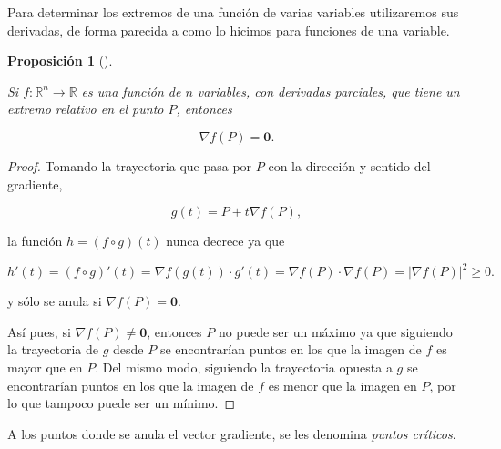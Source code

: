 \documentclass[
  a4paper,
]{scrreport}
\theoremstyle{definition}
\theoremstyle{definition}
\theoremstyle{definition}
\theoremstyle{plain}
\theoremstyle{plain}
\theoremstyle{plain}
\newtheorem{proposition}{Proposición}[chapter]
\theoremstyle{remark}
\begin{document}
Para determinar los extremos de una función de varias variables
utilizaremos sus derivadas, de forma parecida a como lo hicimos para
funciones de una variable.

\begin{proposition}[]\protect\hypertarget{prp-anulacion-gradiente-extremo}{}\label{prp-anulacion-gradiente-extremo}

Si \(f:\mathbb{R}^n\to \mathbb{R}\) es una función de \(n\) variables,
con derivadas parciales, que tiene un extremo relativo en el punto
\(P\), entonces

\[
\nabla f(P) = \mathbf{0}.
\]

\end{proposition}

\begin{tcolorbox}[enhanced jigsaw, bottomtitle=1mm, title=\textcolor{quarto-callout-note-color}{\faInfo}\hspace{0.5em}{Demostración}, colbacktitle=quarto-callout-note-color!10!white, coltitle=black, leftrule=.75mm, colback=white, toptitle=1mm, toprule=.15mm, titlerule=0mm, opacitybacktitle=0.6, colframe=quarto-callout-note-color-frame, bottomrule=.15mm, arc=.35mm, rightrule=.15mm, breakable, left=2mm, opacityback=0]

\begin{proof}
Tomando la trayectoria que pasa por \(P\) con la dirección y sentido del
gradiente,

\[
g(t)=P+t\nabla f(P),
\]

la función \(h=(f\circ g)(t)\) nunca decrece ya que

\[
h'(t)
= (f\circ g)'(t) 
= \nabla f(g(t))\cdot g'(t) 
= \nabla f(P)\cdot \nabla f(P) = 
|\nabla f(P)|^2\geq 0.
\]

y sólo se anula si \(\nabla f(P)= \mathbf{0}\).

Así pues, si \(\nabla f(P)\neq \mathbf{0}\), entonces \(P\) no puede ser
un máximo ya que siguiendo la trayectoria de \(g\) desde \(P\) se
encontrarían puntos en los que la imagen de \(f\) es mayor que en \(P\).
Del mismo modo, siguiendo la trayectoria opuesta a \(g\) se encontrarían
puntos en los que la imagen de \(f\) es menor que la imagen en \(P\),
por lo que tampoco puede ser un mínimo.
\end{proof}

\end{tcolorbox}

A los puntos donde se anula el vector gradiente, se les denomina
\emph{puntos críticos}.
\end{document}
